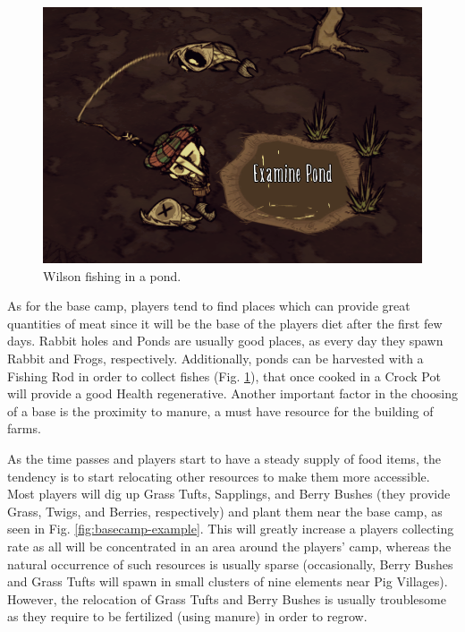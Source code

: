 \begin{figure}
  \centering
  \includegraphics[width=\textwidth]{./Images/fishing}
  \caption{Wilson fishing in a pond.}
  \label{fig:fishing}
\end{figure}

As for the base camp, players tend to find places which can provide great quantities of meat since it will be the base of the players diet after the first few days.
Rabbit holes and Ponds are usually good places, as every day they spawn Rabbit and Frogs, respectively.
Additionally, ponds can be harvested with a Fishing Rod in order to collect fishes (Fig. \ref{fig:fishing}), that once cooked in a Crock Pot will provide a good Health regenerative.
Another important factor in the choosing of a base is the proximity to manure, a must have resource for the building of farms.

As the time passes and players start to have a steady supply of food items, the tendency is to start relocating other resources to make them more accessible.
Most players will dig up Grass Tufts, Sapplings, and Berry Bushes (they provide Grass, Twigs, and Berries, respectively) and plant them near the base camp, as seen in Fig. \ref{fig:basecamp-example}.
This will greatly increase a players collecting rate as all will be concentrated in an area around the players' camp, whereas the natural occurrence of such resources is usually sparse (occasionally, Berry Bushes and Grass Tufts will spawn in small clusters of nine elements near Pig Villages).
However, the relocation of Grass Tufts and Berry Bushes is usually troublesome as they require to be fertilized (using manure) in order to regrow.


